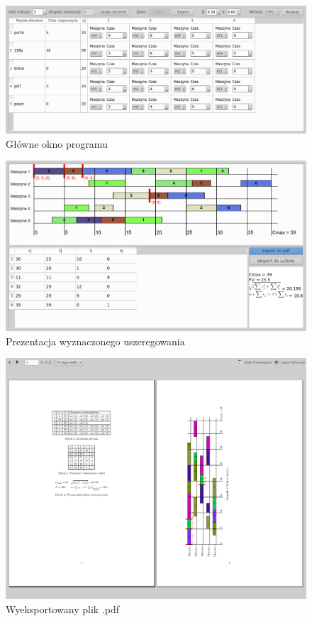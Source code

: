 \documentclass[twoside]{kInzynierka}
\begin{document}
\begin{figure}[htb]
    \centering
    \includegraphics[width=\textwidth, keepaspectratio=true]{./obrazki/main}
    \caption{Główne okno programu}
\end{figure}

\begin{figure}[htb]
    \centering
    \includegraphics[width=\textwidth, keepaspectratio=true]{./obrazki/wykres}
    \caption{Prezentacja wyznaczonego uszeregowania}
\end{figure}

\begin{figure}[htb]
    \centering
    \includegraphics[width=\textwidth, keepaspectratio=true]{./obrazki/pdf}
    \caption{Wyeksportowany plik .pdf}
\end{figure}
\end{document}
